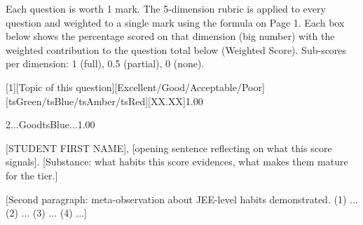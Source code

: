 \documentclass[11pt,a4paper]{article}
\begin{document}

{\fontsize{9pt}{12pt}\selectfont\color{tsGrey} Each question is worth 1 mark. The 5-dimension rubric is applied to every question and weighted to a single mark using the formula on Page 1. Each box below shows the percentage scored on that dimension (big number) with the weighted contribution to the question total below (Weighted Score). Sub-scores per dimension: 1 (full), 0.5 (partial), 0 (none).}


\tsQFunc{[$f(x) = ...$]}                                 %
\tsQAnswer{[$x \in ...$]}{[$x \in ...$]}                 %
\tsQDimRow{[100]}{[100]}{[100]}{[100]}{[100]}            %
\begin{tsQCard}{[1]}{[Topic of this question]}{[Excellent/Good/Acceptable/Poor]}{[tsGreen/tsBlue/tsAmber/tsRed]}{[XX.XX]}{1.00}
\end{tsQCard}

\begin{tsQCard}{2}{...}{Good}{tsBlue}{...}{1.00}
\end{tsQCard}




[STUDENT FIRST NAME], [opening sentence reflecting on what this score signals]. [Substance: what habits this score evidences, what makes them mature for the tier.]

\par\vspace{0.2cm}
[Second paragraph: meta-observation about JEE-level habits demonstrated. (1) ... (2) ... (3) ... (4) ...]

\par\vspace{0.2cm}
\end{document}
